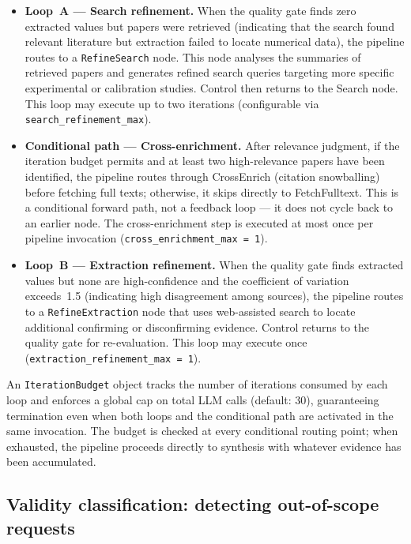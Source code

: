\documentclass[11pt,a4paper]{article}
\begin{document}
\begin{itemize}
  \item \textbf{Loop~A --- Search refinement.} When the quality gate finds zero extracted values but papers were retrieved (indicating that the search found relevant literature but extraction failed to locate numerical data), the pipeline routes to a \texttt{RefineSearch} node. This node analyses the summaries of retrieved papers and generates refined search queries targeting more specific experimental or calibration studies. Control then returns to the Search node. This loop may execute up to two iterations (configurable via \texttt{search\_refinement\_max}).

  \item \textbf{Conditional path --- Cross-enrichment.} After relevance judgment, if the iteration budget permits and at least two high-relevance papers have been identified, the pipeline routes through CrossEnrich (citation snowballing) before fetching full texts; otherwise, it skips directly to FetchFulltext. This is a conditional forward path, not a feedback loop --- it does not cycle back to an earlier node. The cross-enrichment step is executed at most once per pipeline invocation (\texttt{cross\_enrichment\_max\,=\,1}).

  \item \textbf{Loop~B --- Extraction refinement.} When the quality gate finds extracted values but none are high-confidence and the coefficient of variation exceeds~1.5 (indicating high disagreement among sources), the pipeline routes to a \texttt{RefineExtraction} node that uses web-assisted search to locate additional confirming or disconfirming evidence. Control returns to the quality gate for re-evaluation. This loop may execute once (\texttt{extraction\_refinement\_max\,=\,1}).
\end{itemize}

\noindent An \texttt{IterationBudget} object tracks the number of iterations consumed by each loop and enforces a global cap on total LLM calls (default: 30), guaranteeing termination even when both loops and the conditional path are activated in the same invocation. The budget is checked at every conditional routing point; when exhausted, the pipeline proceeds directly to synthesis with whatever evidence has been accumulated.


\subsection{Validity classification: detecting out-of-scope requests}
\label{sec:bullshitbench-design}
\end{document}
